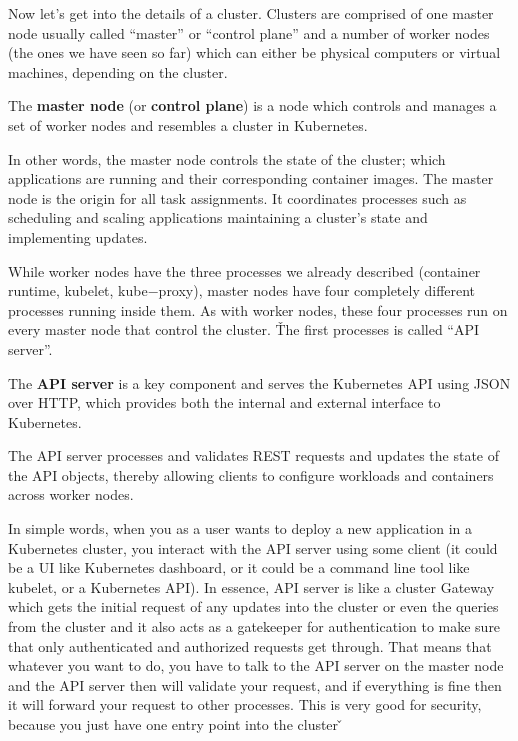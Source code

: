 Now let's get into the details of a cluster. Clusters are comprised of one master node usually called ``master'' or
``control plane'' and a number of worker nodes (the ones we have seen so far) which can either be physical computers
or virtual machines, depending on the cluster.

The \textbf{master node} (or \textbf{control plane}) is a node which controls and manages a set of worker nodes and
resembles a cluster in Kubernetes.
\ed

In other words, the master node controls the state of the cluster; which applications are running and their
corresponding container images. The master node is the origin for all task assignments. It coordinates processes such
as scheduling and scaling applications maintaining a cluster's state and implementing updates.


While worker nodes have the three processes we already described (container runtime, kubelet, kube$-$proxy), master
nodes have four completely different processes running inside them. As with worker nodes, these four processes run on
every master node that control the cluster. \v

The first processes is called ``API server''.

The \textbf{API server} is a key component and serves the Kubernetes API using JSON over HTTP, which provides both the
internal and external interface to Kubernetes.
\ed

The API server processes and validates REST requests and updates the state of the API objects, thereby allowing
clients to configure workloads and containers across worker nodes.


In simple words, when you as a user wants to deploy a new application in a Kubernetes cluster, you interact with the
API server using some client (it could be a UI like Kubernetes dashboard, or it could be a command line tool like
kubelet, or a Kubernetes API). In essence, API server is like a cluster Gateway which gets the initial request of any
updates into the cluster or even the queries from the cluster and it also acts as a gatekeeper for authentication to
make sure that only authenticated and authorized requests get through. That means that whatever you want to do, you
have to talk to the API server on the master node and the API server then will validate your request, and if
everything is fine then it will forward your request to other processes. This is very good for security, because you
just have one entry point into the cluster \v

